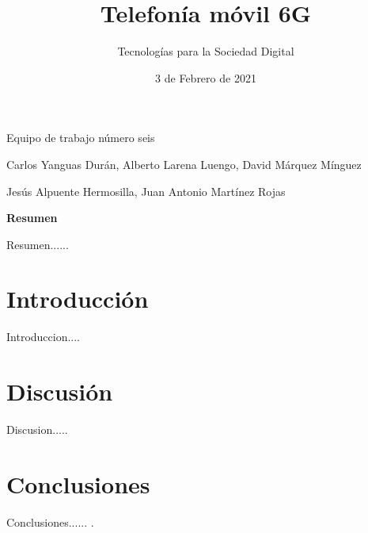  

 

\graphicspath{{../Book/figures/}}


\title{Telefonía móvil 6G}
\date{3 de Febrero de 2021}            
\author{Tecnologías para la Sociedad Digital}




\maketitle
\begin{description}                             
  {        
  \item[Título en inglés:] \mybooktitleenglish   
  }                                            
  {                                           
  }                                              
\item[Equipo:] Equipo de trabajo número seis     
\item[Autores:] Carlos Yanguas Durán, Alberto Larena Luengo, David Márquez Mínguez                
\item[\expandafter\makefirstuc\expandafter{\mybookTutorOrTutores}:] Jesús Alpuente Hermosilla, Juan Antonio Martínez Rojas          
\end{description}   

\begin{center}
 {\bfseries \Large Resumen}
\end{center}

Resumen......                                    

\section{Introducción}
\label{sec:introduccion}

Introduccion....


\section{Discusión}
\label{sec:discusion}

Discusion.....

\section{Conclusiones}
\label{sec:conclusiones}
Conclusiones...... \cite{AMI}.

          





